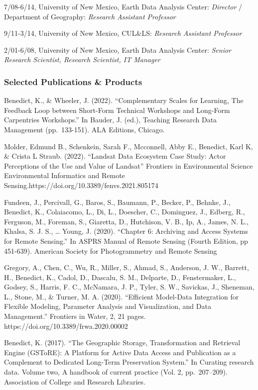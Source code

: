 \documentclass[]{article}
\begin{document}
7/08-6/14, University of New Mexico, Earth Data Analysis Center:
\emph{Director} / Department of Geography: \emph{Research Assistant
Professor}

9/11-3/14, University of New Mexico, CUL\&LS: \emph{Research Assistant
Professor}

2/01-6/08, University of New Mexico, Earth Data Analysis Center:
\emph{Senior Research Scientist, Research Scientist, IT Manager}

\subsubsection{Selected Publications \&
Products}\label{selected-publications-products}

Benedict, K., \& Wheeler, J. (2022). ``Complementary Scales for
Learning, The Feedback Loop between Short-Form Technical Workshops and
Long-Form Carpentries Workshops.'' In Bauder, J. (ed.), Teaching
Research Data Management (pp.~133-151). ALA Editions, Chicago.

Molder, Edmund B., Schenkein, Sarah F., Mcconnell, Abby E., Benedict,
Karl K, \& Crista L Straub. (2022). ``Landsat Data Ecosystem Case Study:
Actor Perceptions of the Use and Value of Landsat'' Frontiers in
Environmental Science Environmental Informatics and Remote
Sensing.https://doi.org/10.3389/fenvs.2021.805174

Fundeen, J., Percivall, G., Baros, S., Baumann, P., Becker, P., Behnke,
J., Benedict, K., Colaiacomo, L., Di, L., Doescher, C., Dominguez, J.,
Edberg, R., Ferguson, M., Foreman, S., Giaretta, D., Hutchison, V. B.,
Ip, A., James, N. L., Khalsa, S. J. S., \ldots{} Young, J. (2020).
``Chapter 6: Archiving and Access Systems for Remote Sensing.'' In ASPRS
Manual of Remote Sensing (Fourth Edition, pp 451-639). American Society
for Photogrammetry and Remote Sensing

Gregory, A., Chen, C., Wu, R., Miller, S., Ahmad, S., Anderson, J. W.,
Barrett, H., Benedict, K., Cadol, D., Dascalu, S. M., Delparte, D.,
Fenstermaker, L., Godsey, S., Harris, F. C., McNamara, J. P., Tyler, S.
W., Savickas, J., Sheneman, L., Stone, M., \& Turner, M. A. (2020).
``Efficient Model-Data Integration for Flexible Modeling, Parameter
Analysis and Visualization, and Data Management.'' Frontiers in Water,
2, 21 pages. https://doi.org/10.3389/frwa.2020.00002

Benedict, K. (2017). ``The Geographic Storage, Transformation and
Retrieval Engine (GSToRE): A Platform for Active Data Access and
Publication as a Complement to Dedicated Long-Term Preservation
System.'' In Curating research data. Volume two, A handbook of current
practice (Vol. 2, pp.~207--209). Association of College and Research
Libraries.
\end{document}
